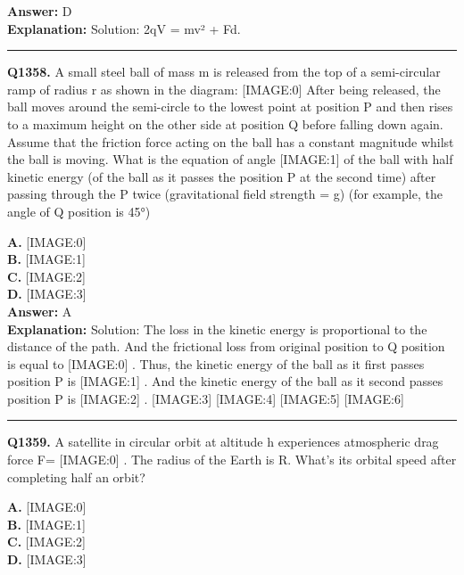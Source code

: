 \documentclass[12pt]{article}
\begin{document}
\textbf{Answer:} D \\
\textbf{Explanation:} Solution: 2qV = mv² + Fd.

\hrule
\vspace{1em}


\noindent
\textbf{Q1358.} A small steel ball of mass m is released from the top of a semi-circular ramp of radius r as shown in the diagram:
[IMAGE:0]
After being released, the ball moves around the semi-circle to the lowest point at position P and then rises to a maximum height on the other side at position Q before falling down again. Assume that the friction force acting on the ball has a constant magnitude whilst the ball is moving. What is the equation of angle
[IMAGE:1]
of the ball with half kinetic energy (of the ball as it passes the position P at the second time) after passing through the P twice (gravitational field strength = g) (for example, the angle of Q position is 45°)



\textbf{A.} [IMAGE:0] \\
\textbf{B.} [IMAGE:1] \\
\textbf{C.} [IMAGE:2] \\
\textbf{D.} [IMAGE:3] \\

\textbf{Answer:} A \\
\textbf{Explanation:} Solution:
The loss in the kinetic energy is proportional to the distance of the path. And the frictional loss from original position to Q position is equal to
[IMAGE:0]
. Thus, the kinetic energy of the ball as it first passes position P is
[IMAGE:1]
. And the kinetic energy of the ball as it second passes position P is
[IMAGE:2]
.
[IMAGE:3]
[IMAGE:4]
[IMAGE:5]
[IMAGE:6]

\hrule
\vspace{1em}


\noindent
\textbf{Q1359.} A satellite in circular orbit at altitude h experiences atmospheric drag force F=
[IMAGE:0]
. The radius of the Earth is R. What's its orbital speed after completing half an orbit?



\textbf{A.} [IMAGE:0] \\
\textbf{B.} [IMAGE:1] \\
\textbf{C.} [IMAGE:2] \\
\textbf{D.} [IMAGE:3] \\
\end{document}
